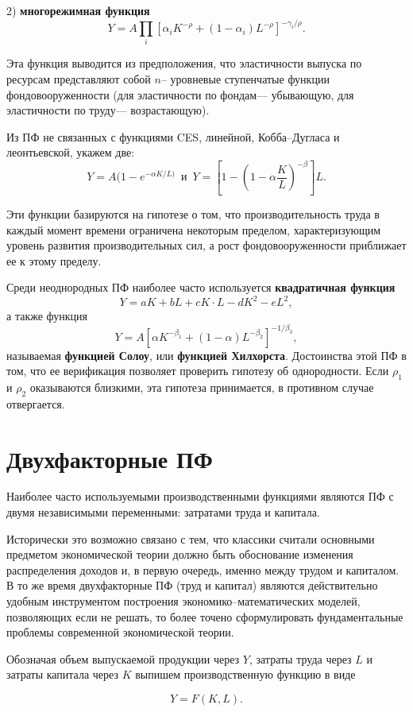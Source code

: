 \documentclass[12pt,openbib]{report}
\begin{document}
2) {\bf многорежимная функция} $$Y=A\prod_i[\alpha_i
K^{-\rho}+(1-\alpha_i)L^{-\rho}]^{-\gamma_i/\rho}.$$

Эта функция выводится из предположения, что эластичности выпуска по
ресурсам представляют собой $n$-- уровневые ступенчатые функции
фондовооруженности (для эластичности по фондам--- убывающую, для
эластичности по труду--- возрастающую).

Из ПФ не связанных с функциями CES, линейной, Кобба--Дугласа и
леонтьевской, укажем две:
$$Y=A(1-e^{-\alpha K/L)}\,\mbox{ и }\,Y=\left[1-\left(1-\alpha\frac
KL\right)^{-\beta}\right]L.$$

Эти функции базируются на гипотезе о том, что производительность
труда в каждый момент времени ограничена некоторым пределом,
характеризующим уровень развития производительных сил, а рост
фондовооруженности приближает ее к этому пределу.

Среди неоднородных ПФ наиболее часто используется {\bf квадратичная
функция} $$Y=aK+bL+cK\cdot L-dK^2-eL^2,$$ а также функция
$$Y=A[\alpha K^{-\beta_1}+(1-\alpha)L^{-\beta_2}]^{-1/\beta_3},$$
называемая {\bf функцией Солоу}, или {\bf функцией Хилхорста}.
Достоинства этой ПФ в том, что ее верификация позволяет проверить
гипотезу об однородности. Если $\rho_1$ и $\rho_2$ оказываются
близкими, эта гипотеза принимается, в противном случае отвергается.

\section{Двухфакторные ПФ}


Наиболее часто используемыми производственными функциями являются ПФ
с двумя независимыми переменными: затратами труда и капитала.

Исторически это возможно связано с тем, что классики считали
основными предметом экономической теории должно быть обоснование
изменения распределения доходов и, в первую очередь, именно между
трудом и капиталом. В то же время двухфакторные ПФ (труд и капитал)
являются действительно удобным инструментом построения
экономико--математических моделей, позволяющих если не решать, то
более точено сформулировать фундаментальные проблемы современной
экономической теории.

Обозначая объем выпускаемой продукции через $Y$, затраты труда через
$L$ и затраты капитала через $K$ выпишем производственную функцию в
виде

\begin{equation}\label{f121}
Y=F(K,L).
\end{equation}
\end{document}
